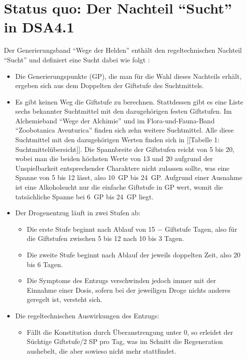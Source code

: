 \section{Status quo: Der Nachteil \enquote{Sucht} in DSA4.1}
Der Generierungsband \enquote{Wege der Helden} \cite{WdH} enthält den regeltechnischen Nachteil \enquote{Sucht} und definiert eine Sucht dabei wie folgt \cite[S.~271]{WdH}:

\begin{itemize}
	\item Die Generierungspunkte (GP), die man für die Wahl dieses Nachteils erhält, ergeben sich aus dem Doppelten der Giftstufe des Suchtmittels.
	\item Es gibt keinen Weg die Giftstufe zu berechnen. Stattdessen gibt es eine Liste sechs bekannter Suchtmittel mit den dazugehörigen festen Giftstufen. Im Alchemieband \enquote{Wege der Alchimie} \cite{WdA} und im Flora-und-Fauna-Band \enquote{Zoobotanica Aventurica} \cite{ZBA} finden sich zehn weitere Suchtmittel. Alle diese Suchtmittel mit den dazugehörigen Werten finden sich in [[Tabelle 1: Suchtmittelübersicht]]. Die Spannbreite der Giftstufen reicht von 5 bis 20, wobei man die beiden höchsten Werte von 13 und 20 aufgrund der Unspielbarkeit entsprechender Charaktere nicht zulassen sollte, was eine Spanne von 5 bis 12 lässt, also 10~GP bis 24~GP. Aufgrund einer Ausnahme ist eine Alkoholsucht nur die einfache Giftstufe in GP wert, womit die tatsächliche Spanne bei 6~GP bis 24~GP liegt.
	\item Der Drogenentzug läuft in zwei Stufen ab:
		\begin{itemize}
			\item Die erste Stufe beginnt nach Ablauf von 15 − Giftstufe Tagen, also für die Giftstufen zwischen 5 bis 12 nach 10 bis 3 Tagen.
			\item Die zweite Stufe beginnt nach Ablauf der jeweils doppelten Zeit, also 20 bis 6 Tagen.
			\item Die Symptome des Entzugs verschwinden jedoch immer mit der Einnahme einer Dosis, sofern bei der jeweiligen Droge nichts anderes geregelt ist, versteht sich.
		\end{itemize}
	\item Die regeltechnischen Auswirkungen des Entzugs:
		\begin{itemize}
			\item Fällt die Konstitution durch Überanstrengung unter 0, so erleidet der Süchtige Giftstufe/2 SP pro Tag, was im Schnitt die Regeneration aushebelt, die aber sowieso nicht mehr stattfindet.

\end{itemize}
\end{itemize}
